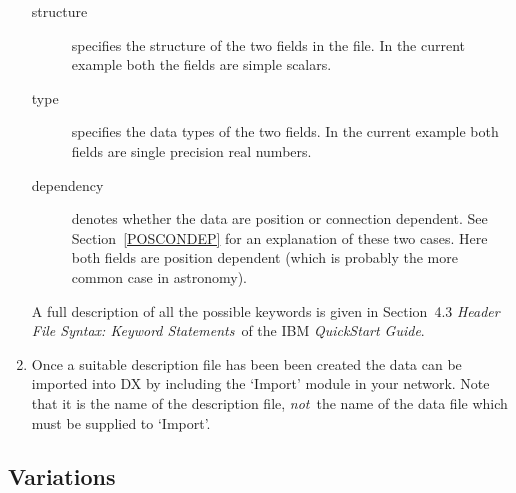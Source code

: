\documentclass[twoside,11pt]{article}
\begin{document}
\begin{enumerate}
\begin{description}
    \item[structure] specifies the structure of the two fields in the
     file. In the current example both the fields are simple scalars.

    \item[type] specifies the data types of the two fields. In the
     current example both fields are single precision real numbers.

    \item[dependency] denotes whether the data are position or
     connection dependent. See Section~\ref{POSCONDEP} for an
     explanation of these two cases. Here both fields are position
     dependent (which is probably the more common case in astronomy).

  \end{description}

   A full description of all the possible keywords is given in
   Section~4.3 {\it Header File Syntax: Keyword Statements}\, of the
   IBM {\it QuickStart Guide}\cite{QUICKS}.

  \item Once a suitable description file has been been created the data
   can be imported into DX by including the `Import' module in your
   network. Note that it is the name of the description file, {\it not}\,
   the name of the data file which must be supplied to `Import'.

\end{enumerate}

\subsection{Variations}
\end{document}
